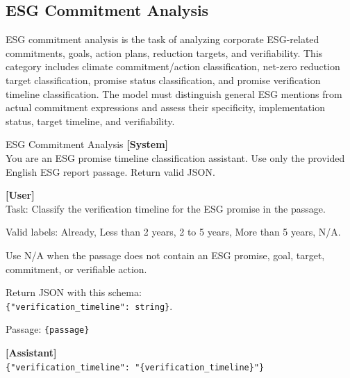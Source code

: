 \documentclass[11pt]{article}
\begin{document}
\subsection{ESG Commitment Analysis}
ESG commitment analysis is the task of analyzing corporate ESG-related commitments, goals, action plans, reduction targets, and verifiability. This category includes climate commitment/action classification, net-zero reduction target classification, promise status classification, and promise verification timeline classification. The model must distinguish general ESG mentions from actual commitment expressions and assess their specificity, implementation status, target timeline, and verifiability.

\begin{promptbox}{ESG Commitment Analysis}
\small
\textbf{[System]}\\
You are an ESG promise timeline classification assistant. Use only the provided English ESG report passage. Return valid JSON.

\vspace{0.6em}
\textbf{[User]}\\
Task: Classify the verification timeline for the ESG promise in the passage.

\vspace{0.3em}
Valid labels: Already, Less than 2 years, 2 to 5 years, More than 5 years, N/A.

\vspace{0.3em}
Use N/A when the passage does not contain an ESG promise, goal, target, commitment, or verifiable action.

\vspace{0.3em}
Return JSON with this schema:\\ \texttt{\{"verification\_timeline": string\}}.

\vspace{0.3em}
Passage: \texttt{\{passage\}}

\vspace{0.6em}
\textbf{[Assistant]}\\
\texttt{\{"verification\_timeline": "\{verification\_timeline\}"\}}
\end{promptbox}
\end{document}
